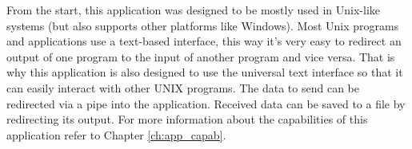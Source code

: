 From the start, this application was designed to be mostly used in Unix-like systems (but also supports other platforms like Windows). Most Unix programs and applications use a text-based interface, this way it's very easy to redirect an output of one program to the input of another program and vice versa. That is why this application is also designed to use the universal text interface so that it can easily interact with other UNIX programs. The data to send can be redirected via a pipe into the application. Received data can be saved to a file by redirecting its output. For more information about the capabilities of this application refer to Chapter \ref{ch:app_capab}.
